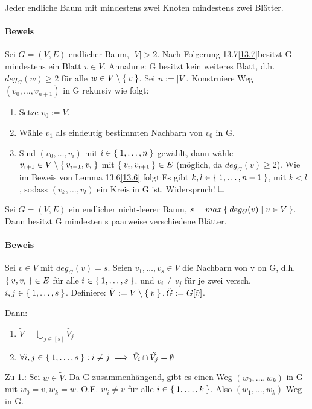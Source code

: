 \documentclass{../../meta/tudscript}
\begin{document}
Jeder endliche Baum mit mindestens zwei Knoten mindestens zwei Blätter.
\paragraph{Beweis}
Sei $G = (V, E)$ endlicher Baum, $|V| > 2$. Nach Folgerung 13.7\ref{13.7}besitzt G mindestens ein Blatt $v \in V$.
Annahme: G besitzt kein weiteres Blatt, d.h. $deg_G (w) \geq 2$ für alle $w \in V \setminus \Set{v}$. Sei $n := |V|$.
Konstruiere Weg $(v_0, \ldots, v_{n + 1})$ in G rekursiv wie folgt:
\begin{enumerate}
\item Setze $v_0 := V$.
\item Wähle $v_1$ als eindeutig bestimmten Nachbarn von $v_0$ in G.
\item Sind $(v_0, \ldots, v_i)$ mit $i \in \Set{1, \ldots, n}$ gewählt, dann wähle $v_{i+1} \in V \setminus \Set{v_{i-1}, v_i}$ mit 
$\Set{v_i, v_{i+1}} \in E$ (möglich, da $deg_G (v) \geq 2$).
Wie im Beweis von Lemma 13.6\ref{13.6} folgt:Es gibt $k, l \in \Set{1, \ldots, n-1}$, mit $k < l$, sodass $(v_k, \ldots, v_l)$ ein Kreis in G ist.
Widerspruch! $\hfill\square$
\end{enumerate}

Sei $G = (V, E)$ ein endlicher nicht-leerer Baum, $s = max \Set{deg_G (v) \mid v \in V}$. Dann besitzt G mindesten s 
paarweise verschiedene Blätter.

\paragraph{Beweis}
Sei $v \in V$ mit $deg_G (v) = s$. Seien $v_1, \ldots, v_s \in V$ die Nachbarn von v on G, d.h. $\Set{v, v_i} \in E$ für alle $i \in \Set{1, \ldots, s}$.
und $v_i \neq v_j$ für je zwei versch. $i, j \in \Set{1, \ldots, s}$.
Definiere: $\tilde{V} := V \setminus \Set{v},\tilde{G} := G[\tilde{v}]$.

Dann:
\begin{enumerate}
\item $\tilde{V} = \bigcup_{j \in [s]} \tilde{V_j}$
\item $\forall i, j \in \Set{1, \ldots, s}: i \neq j \implies \tilde{V_i} \cap \tilde{V_j} = \emptyset$
\end{enumerate}
Zu 1.: Sei  $w \in \tilde{V}$. Da G zusammenhängend, gibt es einen Weg $(w_0, \ldots, w_k)$ in G mit $w_0 = v, w_k = w$. O.E. $w_i \neq v$
für alle $i \in \Set{1, \ldots, k}$. Also $(w_1, \ldots, w_k)$ Weg in G.
\end{document}
